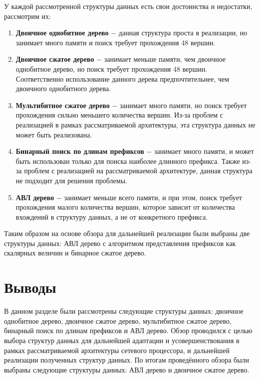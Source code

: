 \documentclass[a4peper, 12pt, titlepage, finall]{report}
\begin{document}
        У каждой рассмотренной структуры данных есть свои достоинства и недостатки, рассмотрим их:
        \begin{enumerate}
            \item \textbf{Двоичное однобитное дерево} $-$ данная структура проста в реализации, но занимает много памяти и поиск требует прохождения 48 вершин.
            \item \textbf{Двоичное сжатое дерево} $-$ занимает меньше памяти, чем двоичное однобитное дерево, но поиск требует прохождения 48 вершин. 
                Соответственно использование данного дерева предпочтительнее, чем двоичного однобитного дерева.
            \item \textbf{Мультибитное сжатое дерево} $-$ занимает много памяти, но поиск требует прохождения сильно меньшего количества вершин. 
                Из-за проблем с реализацией в рамках рассматриваемой архитектуры, эта структура данных не может быть реализована.
            \item \textbf{Бинарный поиск по длинам префиксов} $-$ занимает много памяти, и может быть использован только для поиска наиболее длинного префикса.
                Также из-за проблем с реализацией на рассматриваемой архитектуре, данная структура не подходит для решения проблемы.
            \item \textbf{АВЛ дерево} $-$ занимает меньше всего памяти, и при этом, поиск требует прохождения малого количества вершин,
                которое зависит от количества вхождений в структуру данных, а не от конкретного префикса.
        \end{enumerate}

        Таким образом на основе обзора для дальнейшей реализации были выбраны две структуры данных: 
        АВЛ дерево с алгоритмом представления префиксов как скалярных величин и бинарное сжатое дерево.
    \section{Выводы}
        В данном разделе были рассмотрены следующие структуры данных: двоичное однобитное дерево, двоичное сжатое дерево, мультибитное сжатое дерево, бинарный поиск по длинам префиксов и АВЛ дерево.
        Обзор проводился с целью выбора структур данных для дальнейшей адаптации и усовершенствования в рамках рассматриваемой архитектуры сетевого процессора, 
        и дальнейшей реализации полученных структур данных. По итогам проведённого обзора были выбраны следующие структуры данных: АВЛ дерево и двоичное сжатое дерево.
\end{document}
